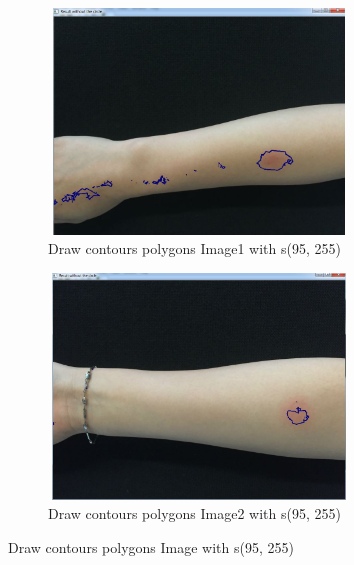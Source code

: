  \begin{figure}[!h]
\centering
\begin{subfigure}{.5\textwidth}
  \centering
  \includegraphics[width=8cm,height=6cm]{img/4}
  \caption{Draw contours polygons Image1 with s(95, 255)}
  \label{fig:sub1}
\end{subfigure}%
\begin{subfigure}{.5\textwidth}
  \centering
  \includegraphics[width=8cm,height=6cm]{img/2}
  \caption{Draw contours polygons Image2 with s(95, 255)}
  \label{fig:sub2}
\end{subfigure}
\caption{Draw contours polygons Image with s(95, 255)}
\label{fig:test}
\end{figure}


